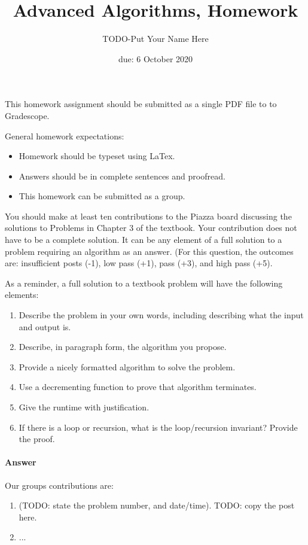 \documentclass{article}
\title{Advanced Algorithms, Homework \hwnum}
\author{TODO-Put Your Name Here}
\date{due: 6 October 2020}
\begin{document}
\maketitle

This homework assignment should be
submitted as a single PDF file to to Gradescope.

General homework expectations:
\begin{itemize}
    \item Homework should be typeset using LaTex.
    \item Answers should be in complete sentences and proofread.
    \item This homework can be submitted as a group.
\end{itemize}

\nextprob
{}

You should make at least ten contributions to the Piazza board
discussing the solutions to Problems in Chapter 3 of the textbook.  Your
contribution does not have to be a complete solution.  It can be any element of
a full solution to a problem requiring an algorithm as an answer.  (For this
question, the outcomes are: insufficient posts (-1), low pass (+1), pass (+3),
and high pass (+5).

As a reminder, a full solution to a textbook problem will have the following elements:
\begin{enumerate}
    \item Describe the problem in your own words, including
        describing what the input and output is.
    \item Describe, in paragraph form, the algorithm you propose.
    \item Provide a nicely formatted algorithm to solve the problem.
    \item Use a decrementing function to prove that algorithm terminates.
    \item Give the runtime with justification.
    \item If there is a loop or recursion, what is the loop/recursion invariant? Provide the proof.
\end{enumerate}

\paragraph{Answer}


Our groups contributions are:
\begin{enumerate}
    \item (TODO: state the problem number, and date/time). TODO:
        copy the post here.
    \item ...
\end{enumerate}
\end{document}
